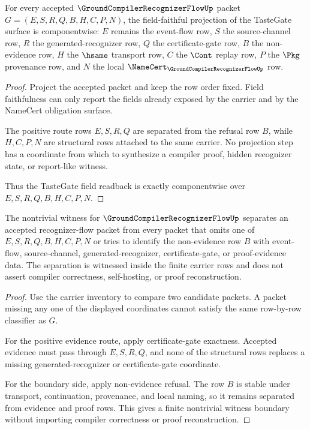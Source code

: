 \begin{theorem}
\label{thm:groundcompiler-recognizer-flow-field-faithful-readback}
For every accepted $\GroundCompilerRecognizerFlowUp$ packet $G=(E,S,R,Q,B,H,C,P,N)$, the field-faithful projection of the TasteGate surface is componentwise: $E$ remains the event-flow row, $S$ the source-channel row, $R$ the generated-recognizer row, $Q$ the certificate-gate row, $B$ the non-evidence row, $H$ the $\hsame$ transport row, $C$ the $\Cont$ replay row, $P$ the $\Pkg$ provenance row, and $N$ the local $\NameCert_{\GroundCompilerRecognizerFlowUp}$ row.
\end{theorem}
\begin{proof}
Project the accepted packet and keep the row order fixed. Field faithfulness can only report the fields already exposed by the carrier and by the NameCert obligation surface.

The positive route rows $E,S,R,Q$ are separated from the refusal row $B$, while $H,C,P,N$ are structural rows attached to the same carrier. No projection step has a coordinate from which to synthesize a compiler proof, hidden recognizer state, or report-like witness.

Thus the TasteGate field readback is exactly componentwise over $E,S,R,Q,B,H,C,P,N$.
\end{proof}

\begin{theorem}
\label{thm:groundcompiler-recognizer-flow-nontrivial-witness-boundary}
The nontrivial witness for $\GroundCompilerRecognizerFlowUp$ separates an accepted recognizer-flow packet from every packet that omits one of $E,S,R,Q,B,H,C,P,N$ or tries to identify the non-evidence row $B$ with event-flow, source-channel, generated-recognizer, certificate-gate, or proof-evidence data. The separation is witnessed inside the finite carrier rows and does not assert compiler correctness, self-hosting, or proof reconstruction.
\end{theorem}
\begin{proof}
Use the carrier inventory to compare two candidate packets. A packet missing any one of the displayed coordinates cannot satisfy the same row-by-row classifier as $G$.

For the positive evidence route, apply certificate-gate exactness. Accepted evidence must pass through $E,S,R,Q$, and none of the structural rows replaces a missing generated-recognizer or certificate-gate coordinate.

For the boundary side, apply non-evidence refusal. The row $B$ is stable under transport, continuation, provenance, and local naming, so it remains separated from evidence and proof rows. This gives a finite nontrivial witness boundary without importing compiler correctness or proof reconstruction.
\end{proof}

